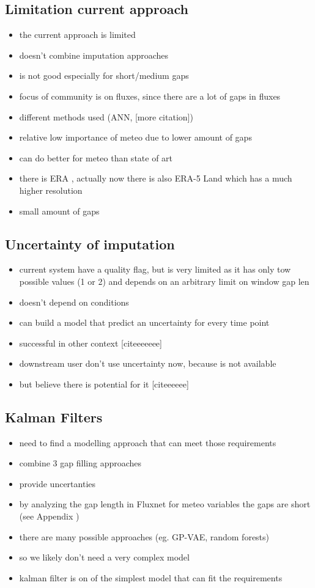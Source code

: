 \documentclass{article}
\let\Oldsubsection\subsection
\renewcommand{\subsection}{\FloatBarrier\Oldsubsection}
\begin{document}
\subsection{Limitation current approach}
\begin{itemize}
\item the current approach is limited
\item doesn't combine imputation approaches
\item is not good especially for short/medium gaps
\item focus of community is on fluxes, since there are a lot of gaps in fluxes
\item different methods used (ANN, [more citation])
\item relative low importance of meteo due to lower amount of gaps
\item can do better for meteo than state of art
\item there is  ERA , actually now there is also ERA-5 Land which has a much higher resolution
\item small amount of gaps
\end{itemize}

\subsection{Uncertainty of imputation}
\begin{itemize}
\item current system have a quality flag, but is very limited as it has only tow possible values (1 or 2) and depends on an arbitrary limit on window gap len
\item doesn't depend on conditions
\item can build a model that predict an uncertainty for every time point
\item successful in other context [citeeeeeee]
\item downstream user don't use uncertainty now, because is not available
\item but believe there is potential for it [citeeeeee]
\end{itemize}

\subsection{Kalman Filters}
\begin{itemize}
\item need to find a modelling approach that can meet those requirements
\item combine 3 gap filling approaches
\item provide uncertanties
\item by analyzing the gap length in Fluxnet for meteo variables the gaps are short (see Appendix )
\item there are many possible approaches (eg. GP-VAE, random forests)
\item so we likely don't need a very complex model
\item kalman filter is on of the simplest model that can fit the requirements
\end{itemize}
\end{document}
